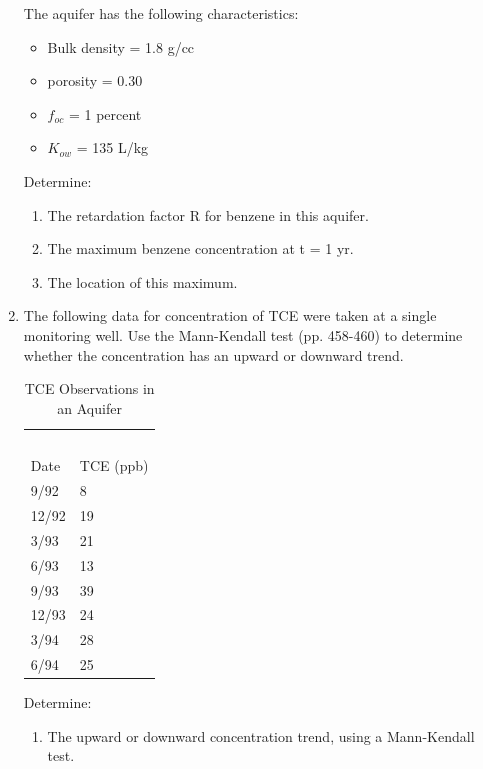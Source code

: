 \documentclass[12pt]{article}
\begin{document}
\begin{enumerate}
The aquifer has the following characteristics: 

\begin{itemize} %
\item Bulk density = 1.8 g/cc
\item porosity = 0.30
\item $f_{oc}$ =  1 percent
\item $K_{ow}$ = 135 L/kg
\end{itemize} %

Determine:
\begin{enumerate} %
\item The retardation factor R for benzene in this aquifer.  
\item The maximum benzene concentration at t = 1 yr.
\item The location of this maximum.
\end{enumerate} %
\clearpage
\item 

The following data for concentration of TCE were taken at a single monitoring well.  Use the Mann-Kendall test (pp. 458-460) to determine whether the concentration has an upward or downward trend.

\begin{table}[htbp]
\centering
\caption{TCE Observations in an Aquifer}
\begin{tabular}{p{1.5in}p{1.5in}} %
~&~\\
Date&TCE (ppb)\\
\hline
\hline
9/92&8\\
12/92&19\\
3/93&21\\
6/93&13\\
9/93&39\\
12/93&24\\
3/94&28\\
6/94&25\\
\hline
\end{tabular}
\label{tab:TCEobserve}
\end{table}

Determine:
\begin{enumerate} %
\item The upward or downward concentration trend, using a Mann-Kendall test.
\end{enumerate} %

\end{enumerate}%
\end{document}

